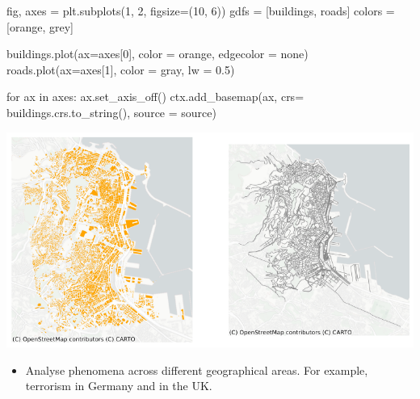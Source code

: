 \documentclass[
  letterpaper,
  DIV=11,
  numbers=noendperiod]{scrreprt}
\newenvironment{Shaded}{\begin{snugshade}}{\end{snugshade}}
\newcommand{\ControlFlowTok}[1]{\textcolor[rgb]{0.00,0.23,0.31}{#1}}
\newcommand{\DecValTok}[1]{\textcolor[rgb]{0.68,0.00,0.00}{#1}}
\newcommand{\FloatTok}[1]{\textcolor[rgb]{0.68,0.00,0.00}{#1}}
\newcommand{\KeywordTok}[1]{\textcolor[rgb]{0.00,0.23,0.31}{#1}}
\newcommand{\NormalTok}[1]{\textcolor[rgb]{0.00,0.23,0.31}{#1}}
\newcommand{\OperatorTok}[1]{\textcolor[rgb]{0.37,0.37,0.37}{#1}}
\newcommand{\StringTok}[1]{\textcolor[rgb]{0.13,0.47,0.30}{#1}}
\providecommand{\tightlist}{%
  \setlength{\itemsep}{0pt}\setlength{\parskip}{0pt}}\usepackage{longtable,booktabs,array}
\begin{document}
\begin{Shaded}
\begin{Highlighting}[]
\NormalTok{fig, axes }\OperatorTok{=}\NormalTok{ plt.subplots(}\DecValTok{1}\NormalTok{, }\DecValTok{2}\NormalTok{, figsize}\OperatorTok{=}\NormalTok{(}\DecValTok{10}\NormalTok{, }\DecValTok{6}\NormalTok{))}
\NormalTok{gdfs }\OperatorTok{=}\NormalTok{ [buildings, roads]}
\NormalTok{colors }\OperatorTok{=}\NormalTok{ [}\StringTok{\textquotesingle{}orange\textquotesingle{}}\NormalTok{, }\StringTok{\textquotesingle{}grey\textquotesingle{}}\NormalTok{]}

\NormalTok{buildings.plot(ax}\OperatorTok{=}\NormalTok{axes[}\DecValTok{0}\NormalTok{], color }\OperatorTok{=} \StringTok{\textquotesingle{}orange\textquotesingle{}}\NormalTok{, edgecolor }\OperatorTok{=} \StringTok{\textquotesingle{}none\textquotesingle{}}\NormalTok{)}
\NormalTok{roads.plot(ax}\OperatorTok{=}\NormalTok{axes[}\DecValTok{1}\NormalTok{], color }\OperatorTok{=} \StringTok{\textquotesingle{}gray\textquotesingle{}}\NormalTok{, lw }\OperatorTok{=} \FloatTok{0.5}\NormalTok{)}

\ControlFlowTok{for}\NormalTok{ ax }\KeywordTok{in}\NormalTok{ axes:}
\NormalTok{    ax.set\_axis\_off()}
\NormalTok{    ctx.add\_basemap(ax, crs}\OperatorTok{=}\NormalTok{ buildings.crs.to\_string(), source }\OperatorTok{=}\NormalTok{ source)}
\end{Highlighting}
\end{Shaded}

\includegraphics{labs/w02_maps_files/figure-pdf/cell-21-output-1.png}

\begin{itemize}
\tightlist
\item
  Analyse phenomena across different geographical areas. For example,
  terrorism in Germany and in the UK.
\end{itemize}
\end{document}
